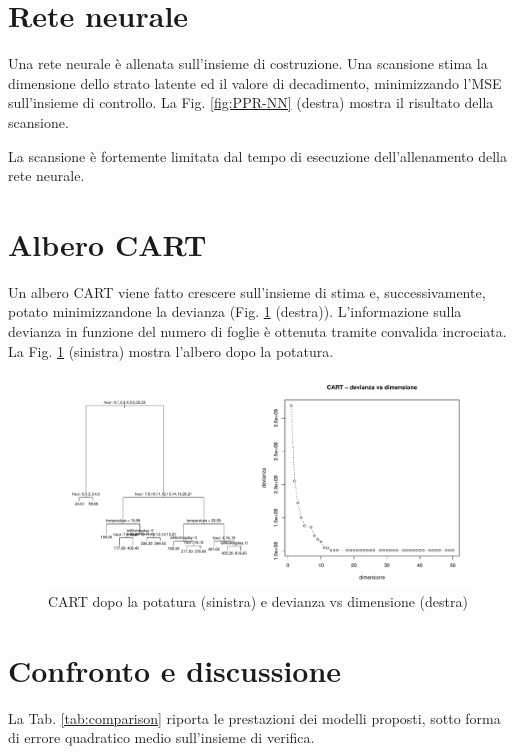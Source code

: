 \documentclass[a4paper, 10pt]{report}
\begin{document}
\section{Rete neurale}
Una rete neurale è allenata sull'insieme di costruzione. Una scansione
stima la dimensione dello strato latente ed il valore di decadimento,
minimizzando l'MSE sull'insieme di controllo. La Fig. \ref{fig:PPR-NN}
(destra) mostra il risultato della scansione.

La scansione è fortemente limitata dal tempo di esecuzione dell'allenamento
della rete neurale.



\section{Albero CART}
Un albero CART viene fatto crescere sull'insieme di stima e,
successivamente, potato minimizzandone la devianza (Fig.
\ref{fig:CART} (destra)). L'informazione sulla devianza in funzione del
numero di foglie è ottenuta tramite convalida incrociata. La Fig.
\ref{fig:CART} (sinistra) mostra l'albero dopo la potatura.

\begin{figure}
  \includegraphics[width=1.0\textwidth]{../plots/CART.pdf}
  \caption{
    CART dopo la potatura (sinistra) e
    devianza vs dimensione (destra)
  }
  \label{fig:CART}
\end{figure}


\section{Confronto e discussione}
La Tab. \ref{tab:comparison} riporta le prestazioni dei modelli proposti,
sotto forma di errore quadratico medio sull'insieme di verifica.
\end{document}
